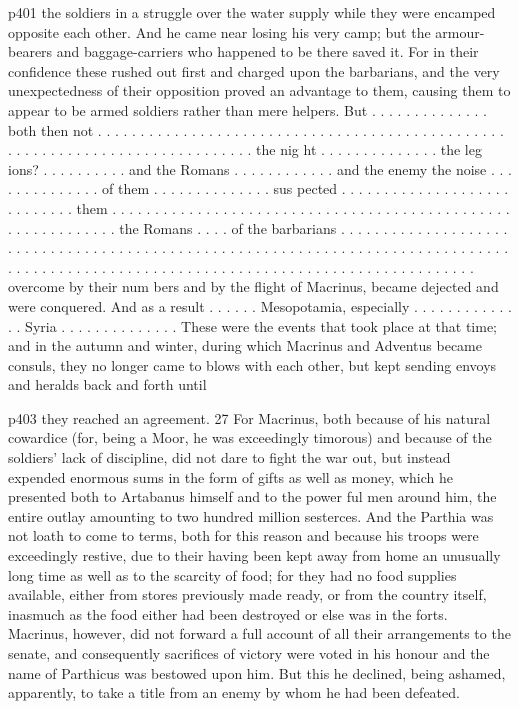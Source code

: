 p401 the soldiers in a struggle over the water supply while they were encamped opposite each other. And he came near losing his very camp; but the armour-bearers and baggage-carriers who happened to be there saved it. For in their confidence these rushed out first and charged upon the barbarians, and the very unexpectedness of their opposition proved an advantage to them, causing them to appear to be armed soldiers rather than mere helpers. But . . . . . . . . . . . . . . both then not . . . . . . . . . . . . . . . . . . . . . . . . . . . . . . . . . . . . . . . . . . . . . . . . . . . . . . . . . . . . . . . . . . . . . . . . . . . . . the nig ht . . . . . . . . . . . . . . the leg ions? . . . . . . . . . . and the Romans . . . . . . . . . . . . and the enemy the noise . . . . . . . . . . . . . . of them . . . . . . . . . . . . . . sus pected . . . . . . . . . . . . . . . . . . . . . . . . . . . . them . . . . . . . . . . . . . . . . . . . . . . . . . . . . . . . . . . . . . . . . . . . . . . . . . . . . . . . . . . . . the Romans . . . . of the barbarians . . . . . . . . . . . . . . . . . . . . . . . . . . . . . . . . . . . . . . . . . . . . . . . . . . . . . . . . . . . . . . . . . . . . . . . . . . . . . . . . . . . . . . . . . . . . . . . . . . . . . . . . . . . . . . . . . . . . . . . . . . . . . . . . . . . . . . overcome by their num bers and by the flight of Macrinus, became dejected and were conquered. And as a result . . . . . . Mesopotamia, especially . . . . . . . . . . . . . . Syria . . . . . . . . . . . . . . These were the events that took place at that time; and in the autumn and winter, during which Macrinus and Adventus became consuls, they no longer came to blows with each other, but kept sending envoys and heralds back and forth until

p403 they reached an agreement. 27
For Macrinus, both because of his natural cowardice (for, being a Moor, he was exceedingly timorous) and because of the soldiers' lack of discipline, did not dare to fight the war out, but instead expended enormous sums in the form of gifts as well as money, which he presented both to Artabanus himself and to the power ­ful men around him, the entire outlay amounting to two hundred million sesterces. And the Parthia was not loath to come to terms, both for this reason and because his troops were exceedingly restive, due to their having been kept away from home an unusually long time as well as to the scarcity of food; for they had no food supplies available, either from stores previously made ready, or from the country itself, inasmuch as the food either had been destroyed or else was in the forts. Macrinus, however, did not forward a full account of all their arrangements to the senate, and consequently sacrifices of victory were voted in his honour and the name of Parthicus was bestowed upon him. But this he declined, being ashamed, apparently, to take a title from an enemy by whom he had been defeated.

